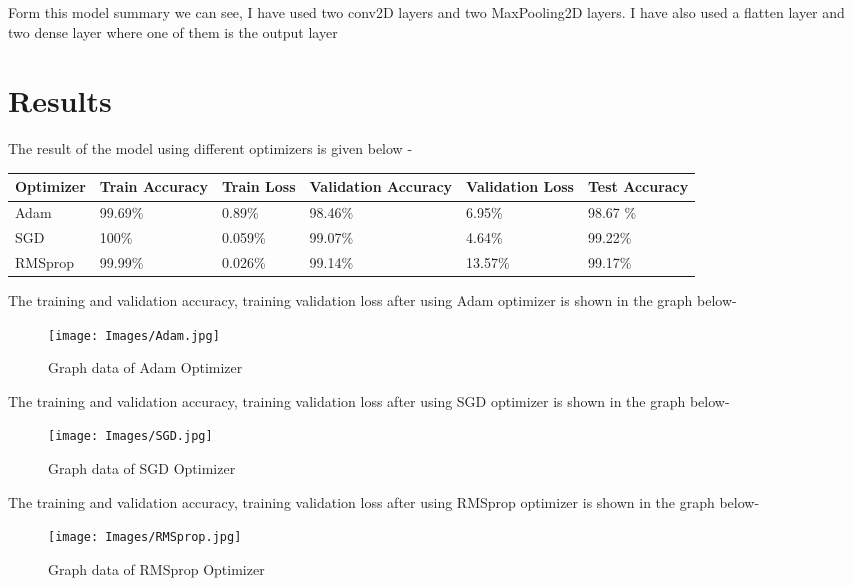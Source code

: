 \documentclass[11pt,a4paper]{article}
\begin{document}
Form this model summary we can see, I have used two conv2D layers and two MaxPooling2D layers. I have also used a flatten layer and two dense layer where one of them is the output layer

\section{Results}
The result of the model using different optimizers is given below -
\begin{table}[h!]
    \centering
    \begin{tabular}{|C{2cm}|C{2cm}|C{2cm}|C{2cm}|C{2cm}|C{2cm}|}
    \hline
       \textbf{Optimizer}  & \textbf{Train Accuracy} & \textbf{Train Loss} & \textbf{Validation Accuracy} &  \textbf{Validation Loss} & \textbf{Test Accuracy} \\
    \hline \hline
    Adam & 99.69\% & 0.89\% & 98.46\% & 6.95\% & 98.67 \% \\
    \hline
    SGD & 100\%  & 0.059\% &99.07\% & 4.64\% & 99.22\% \\
    \hline
    RMSprop & 99.99\%  & 0.026\% &99.14\% & 13.57\% & 99.17\% \\
    \hline
    \end{tabular}
\end{table}

The training and validation accuracy, training validation loss after using Adam optimizer is shown in the graph below-

\begin{figure}[h]
\centering
    \texttt{[image: Images/Adam.jpg]}
    \caption{Graph data of Adam Optimizer }
    \label{fig:my_label}
\end{figure}

The training and validation accuracy, training validation loss after using SGD optimizer is shown in the graph below-
\vspace{2cm}
\begin{figure}[h]
\centering
    \texttt{[image: Images/SGD.jpg]}
    \caption{Graph data of SGD Optimizer }
    \label{fig:my_label}
\end{figure}

\vspace{5cm}
The training and validation accuracy, training validation loss after using RMSprop optimizer is shown in the graph below-
\begin{figure}[h]
\centering
    \texttt{[image: Images/RMSprop.jpg]}
    \caption{Graph data of RMSprop Optimizer}
    \label{fig:my_label}
\end{figure}
\end{document}
